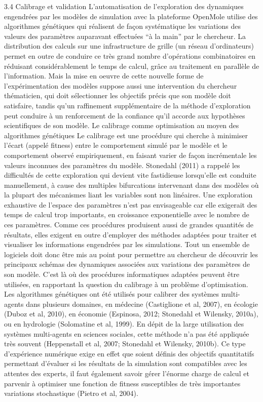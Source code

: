 \documentclass[10pt]{article}
\begin{document}
3.4 Calibrage et validation
L’automatisation de l’exploration des dynamiques engendrées par les modèles de simulation avec la plateforme OpenMole utilise des algorithmes génétiques qui réalisent de façon systématique les variations des valeurs des paramètres auparavant effectuées “à la main” par le chercheur. La distribution des calculs sur une infrastructure de grille (un réseau d’ordinateurs) permet en outre de conduire ce très grand nombre d’opérations combinatoires en réduisant  considérablement le temps de calcul, grâce au traitement en parallèle de l’information.  Mais la mise en oeuvre de cette nouvelle forme de l’expérimentation des modèles suppose aussi une intervention du chercheur thématicien, qui doit sélectionner les objectifs précis que son modèle doit satisfaire, tandis qu’un raffinement supplémentaire de la méthode d’exploration peut conduire à un renforcement de la confiance qu’il accorde aux hypothèses scientifiques de son modèle.
Le calibrage comme optimisation au moyen des algorithmes génétiques
Le calibrage est une procédure qui cherche à minimiser l’écart (appelé fitness) entre le comportement simulé par le modèle et le comportement observé empiriquement, en faisant varier de façon incrémentale les valeurs inconnues des paramètres du modèle. Stonedahl (2011) a rappelé les difficultés de cette exploration qui devient vite fastidieuse lorsqu’elle est conduite manuellement, à cause des multiples bifurcations intervenant dans des modèles où la plupart des mécanismes liant les variables sont non linéaires. Une exploration exhaustive de l’espace des paramètres n’est pas envisageable car elle exigerait des temps de calcul trop importants, en croissance exponentielle avec le nombre de ces paramètres. Comme ces procédures produisent aussi de grandes quantités de résultats, elles exigent en outre d’employer des méthodes adaptées pour traiter et visualiser les informations engendrées par les simulations. Tout un ensemble de logiciels doit donc être mis au point pour permettre au chercheur de découvrir les principaux schémas des dynamiques associées aux variations des paramètres de son modèle.
C’est là où des procédures informatiques adaptées peuvent être utilisées, en rapportant la question du calibrage à un problème d’optimisation. Les algorithmes génétiques ont été utilisés pour calibrer des systèmes multi-agents dans plusieurs domaines, en médecine (Castiglione et al, 2007), en écologie (Duboz et al, 2010), en économie (Espinosa, 2012; Stonedahl et Wilensky, 2010a), ou en hydrologie (Solomatine et al, 1999). En dépit de la large utilisation des systèmes multi-agents en sciences sociales, cette méthode n’a pas été appliquée très souvent (Heppenstall et al, 2007; Stonedahl et Wilensky, 2010b). Ce type d’expérience numérique exige en effet que soient définis des objectifs quantitatifs permettant d’évaluer si les résultats de la simulation sont compatibles avec les attentes des experts, il faut également savoir gérer l’énorme charge de calcul et parvenir à optimiser une fonction de fitness susceptibles de très importantes variations stochastique (Pietro et al, 2004). 
\end{document}
